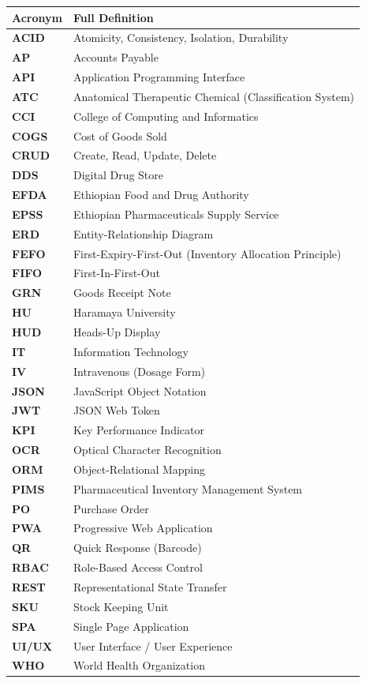 \begin{longtable}{@{}p{}p{}@{}}
\toprule
\textbf{Acronym} & \textbf{Full Definition} \\
\midrule
\endhead
\textbf{ACID} & Atomicity, Consistency, Isolation, Durability \\
\textbf{AP} & Accounts Payable \\
\textbf{API} & Application Programming Interface \\
\textbf{ATC} & Anatomical Therapeutic Chemical (Classification System) \\
\textbf{CCI} & College of Computing and Informatics \\
\textbf{COGS} & Cost of Goods Sold \\
\textbf{CRUD} & Create, Read, Update, Delete \\
\textbf{DDS} & Digital Drug Store \\
\textbf{EFDA} & Ethiopian Food and Drug Authority \\
\textbf{EPSS} & Ethiopian Pharmaceuticals Supply Service \\
\textbf{ERD} & Entity-Relationship Diagram \\
\textbf{FEFO} & First-Expiry-First-Out (Inventory Allocation Principle) \\
\textbf{FIFO} & First-In-First-Out \\
\textbf{GRN} & Goods Receipt Note \\
\textbf{HU} & Haramaya University \\
\textbf{HUD} & Heads-Up Display \\
\textbf{IT} & Information Technology \\
\textbf{IV} & Intravenous (Dosage Form) \\
\textbf{JSON} & JavaScript Object Notation \\
\textbf{JWT} & JSON Web Token \\
\textbf{KPI} & Key Performance Indicator \\
\textbf{OCR} & Optical Character Recognition \\
\textbf{ORM} & Object-Relational Mapping \\
\textbf{PIMS} & Pharmaceutical Inventory Management System \\
\textbf{PO} & Purchase Order \\
\textbf{PWA} & Progressive Web Application \\
\textbf{QR} & Quick Response (Barcode) \\
\textbf{RBAC} & Role-Based Access Control \\
\textbf{REST} & Representational State Transfer \\
\textbf{SKU} & Stock Keeping Unit \\
\textbf{SPA} & Single Page Application \\
\textbf{UI/UX} & User Interface / User Experience \\
\textbf{WHO} & World Health Organization \\
\bottomrule
\end{longtable}

\clearpage
